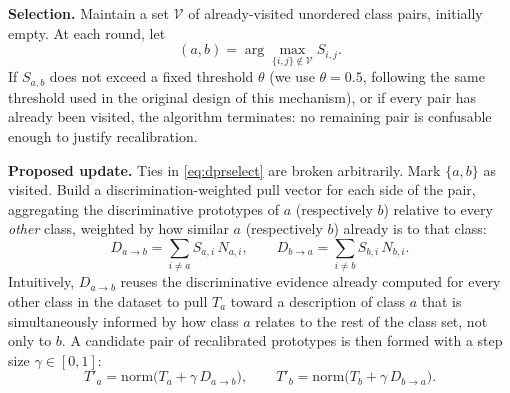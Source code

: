\documentclass{iutbscthesis}
\begin{document}
\textbf{Selection.} Maintain a set $\mathcal{V}$ of already-visited unordered class pairs, initially empty. At each round, let
\begin{equation}
    (a,b) = \arg\max_{\{i,j\} \notin \mathcal{V}} S_{i,j}.
    \label{eq:dprselect}
\end{equation}
If $S_{a,b}$ does not exceed a fixed threshold $\theta$ (we use $\theta = 0.5$, following the same threshold used in the original design of this mechanism), or if every pair has already been visited, the algorithm terminates: no remaining pair is confusable enough to justify recalibration.

\textbf{Proposed update.} Ties in \autoref{eq:dprselect} are broken arbitrarily. Mark $\{a,b\}$ as visited. Build a discrimination-weighted pull vector for each side of the pair, aggregating the discriminative prototypes of $a$ (respectively $b$) relative to every \emph{other} class, weighted by how similar $a$ (respectively $b$) already is to that class:
\begin{equation}
    D_{a \to b} = \sum_{i \ne a} S_{a,i}\, N_{a,i}, \qquad
    D_{b \to a} = \sum_{i \ne b} S_{b,i}\, N_{b,i}.
    \label{eq:dprpull}
\end{equation}
Intuitively, $D_{a \to b}$ reuses the discriminative evidence already computed for every other class in the dataset to pull $T_a$ toward a description of class $a$ that is simultaneously informed by how class $a$ relates to the rest of the class set, not only to $b$. A candidate pair of recalibrated prototypes is then formed with a step size $\gamma \in [0,1]$:
\begin{equation}
    T'_a = \mathrm{norm}\big(T_a + \gamma\, D_{a \to b}\big), \qquad
    T'_b = \mathrm{norm}\big(T_b + \gamma\, D_{b \to a}\big).
    \label{eq:dprcandidate}
\end{equation}
\end{document}
